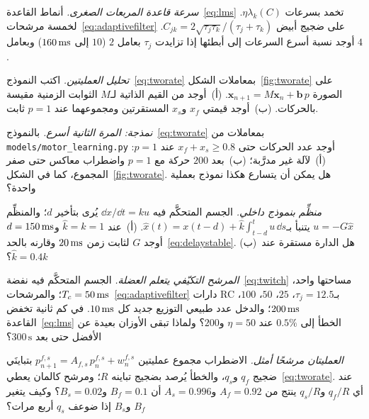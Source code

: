 \begin{exercise}[\lvlB]
\label{ex:15:2}
\emph{سرعة قاعدة المربعات الصغرى.} أنماط القاعدة~\eqref{eq:lms} تخمد بسرعات $\eta\lambda_k(C)$. لخمسة مرشحات~\eqref{eq:adaptivefilter} على ضجيج أبيض $C_{jk}=2\sqrt{\tau_j\tau_k}/(\tau_j+\tau_k)$. أوجد نسبة أسرع السرعات إلى أبطئها إذا تزايدت $\tau_j$ بعامل $2$ ($10$ إلى $160\,\text{ms}$) وبعامل $4$.
\end{exercise}

\begin{exercise}[\lvlB]
\label{ex:15:3}
\emph{تحليل العمليتين.} اكتب النموذج~\eqref{eq:tworate} بمعاملات الشكل~\ref{fig:tworate} على الصورة $\mathbf x_{n+1}=M\mathbf x_n+\mathbf b\,p$. (أ)~أوجد من القيم الذاتية لـ$M$ الثوابت الزمنية مقيسة بالحركات. (ب)~أوجد قيمتي $x_f$ و$x_s$ المستقرتين ومجموعهما عند $p=1$ ثابت.
\end{exercise}

\begin{exercise}[\lvlB]
\label{ex:15:4}
\emph{نمذجة: المرة الثانية أسرع.} بالنموذج~\eqref{eq:tworate} بمعاملات من \foreignlanguage{english}{\texttt{models/\allowbreak motor\_learning.py}} أوجد عدد الحركات حتى $x_f+x_s\ge0.8$ عند $p=1$: (أ)~لآلة غير مدرَّبة؛ (ب)~بعد $200$ حركة مع $p=1$ واضطراب معاكس حتى صفر المجموع، كما في الشكل~\ref{fig:tworate}. هل يمكن أن يتسارع هكذا نموذج بعملية واحدة؟
\end{exercise}

\begin{exercise}[\lvlB]
\label{ex:15:5}
\emph{منظِّم بنموذج داخلي.} الجسم المتحكَّم فيه $\dd x/\dd t=ku$ يُرى بتأخير $d$؛ والمنظِّم $u=-G\hat x$ يتنبأ بـ$\hat x(t)=x(t-d)+\hat k\int_{t-d}^{t}u\,\dd s$. (أ)~عند $\hat k=k=1$ و$d=150\,\text{ms}$ أوجد $G$ لثابت زمن $20\,\text{ms}$ وقارنه بالحد~\eqref{eq:delaystable}. (ب)~هل الدارة مستقرة عند $\hat k=0.4k$؟
\end{exercise}

\begin{exercise}[\lvlB]
\label{ex:15:6}
\emph{المرشح التكيّفي يتعلم العضلة.} الجسم المتحكَّم فيه نفضة~\eqref{eq:twitch} مساحتها واحد، $T_c=50\,\text{ms}$؛ والمرشحات~\eqref{eq:adaptivefilter} دارات \foreignlanguage{english}{RC} بـ$\tau_j=12.5$، $25$، $50$، $100$، $200\,\text{ms}$؛ والدخل عدد طبيعي التوزيع جديد كل $10\,\text{ms}$. في كم ثانية تخفض القاعدة~\eqref{eq:lms} الخطأ إلى $0.5\%$ عند $\eta=50$ و$200$؟ ولماذا تبقى الأوزان بعيدة عن الأفضل حتى بعد $300\,\text{s}$؟
\end{exercise}

\begin{exercise}[\lvlC]
\label{ex:15:7}
\emph{العمليتان مرشحًا أمثل.} الاضطراب مجموع عمليتين $p^{f,s}_{n+1}=A_{f,s}\,p^{f,s}_n+w^{f,s}_n$ بتباينَي ضجيج $q_f$ و$q_s$، والخطأ يُرصد بضجيج تباينه $R$؛ ومرشح كالمان يعطي~\eqref{eq:tworate}. عند أي $q_f/R$ و$q_s/R$ ينتج من $A_f=0.92$ و$A_s=0.996$ أن $B_f=0.1$ و$B_s=0.02$؟ وكيف يتغير $B_f$ و$B_s$ إذا ضوعف $q_s$ أربع مرات؟
\end{exercise}
